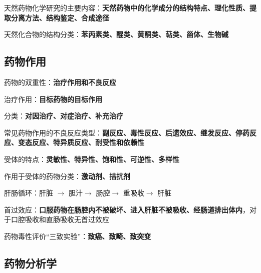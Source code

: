 \begin{notation}
    天然药物化学研究的主要内容：\textbf{天然药物中的化学成分的结构特点、理化性质、提取分离方法、结构鉴定、合成途径}
\end{notation}
\begin{notation}
    天然化合物的结构分类：\textbf{苯丙素类、醌类、黄酮类、萜类、甾体、生物碱}
\end{notation}
\subsection{药物作用}%
\label{sub:复习：药物作用}
\begin{notation}
    药物的双重性：\textbf{治疗作用和不良反应}
\end{notation}
\begin{notation}
    治疗作用：\textbf{目标药物的目标作用}

    分类：\textbf{对因治疗、对症治疗、补充治疗}
\end{notation}
\begin{notation}
常见药物作用的不良反应类型：\textbf{副反应、毒性反应、后遗效应、继发反应、停药反应、变态反应、特异质反应、耐受性和依赖性}
\end{notation}
\begin{notation}
    受体的特点：\textbf{灵敏性、特异性、饱和性、可逆性、多样性}

    作用于受体的药物分类：\textbf{激动剂、拮抗剂}
\end{notation}
\begin{notation}
    肝肠循环：肝脏 $\to $ 胆汁$\to $ 肠腔$\to $ 重吸收$\to $ 肝脏
\end{notation}
\begin{notation}
首过效应：\textbf{口服药物在肠腔内不被破坏、进入肝脏不被吸收、经肠道排出体内}，对于口腔吸收和直肠吸收无首过效应
\end{notation}
\begin{notation}
药物毒性评价“三致实验”：\textbf{致癌、致畸、致突变}
\end{notation}
\subsection{药物分析学}%
\label{sub:复习：药物分析学}
